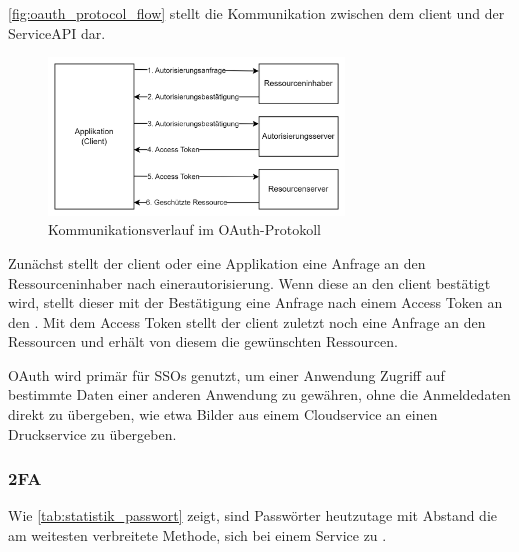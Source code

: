 \autoref{fig:oauth_protocol_flow}\autocite[\vglf][, Abbildung 1]{rfc6749}  stellt die Kommunikation zwischen dem \gls{client} und der Service\nobreakdash\ac{API} dar. 
\begin{figure}[htbp]
    \centering
    \includegraphics[width=0.7\textwidth]{abbildungen/OAuth_abstract_flow.png}
    \caption[Kommunikationsverlauf im OAuth-Protokoll]{Kommunikationsverlauf im OAuth-Protokoll\footnotemark}
    \label{fig:oauth_protocol_flow}
\end{figure}
Zunächst stellt der \gls{client} oder eine Applikation eine Anfrage an den Ressourceninhaber  nach einer\gls{autorisierung}. Wenn diese an den \gls{client} bestätigt wird, stellt dieser mit der Bestätigung eine Anfrage nach einem Access Token an den . Mit dem Access Token stellt der \gls{client} zuletzt noch eine Anfrage an den Ressourcen und erhält von diesem die gewünschten Ressourcen.

OAuth wird primär für \acp{SSO} genutzt, um \zbol einer Anwendung Zugriff auf bestimmte Daten einer anderen Anwendung zu gewähren, ohne die Anmeldedaten direkt zu übergeben, wie etwa Bilder aus einem Cloudservice an einen Druckservice zu übergeben.\autocite[\vglf][]{OAuthWebProtocol:2012}

\subsubsection[2-Factor Authentifizierung]{\acf{2FA}}\label{subsubsec:2fa}
Wie \autoref{tab:statistik_passwort} \autocite{statista_authentifizierung} zeigt, sind Passwörter heutzutage mit Abstand die am weitesten verbreitete Methode, sich bei einem Service zu .

